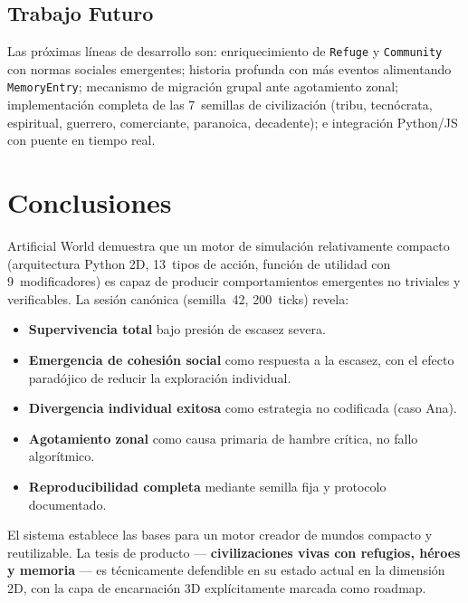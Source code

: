 \documentclass[11pt,a4paper,twocolumn]{article}
\begin{document}
\subsection{Trabajo Futuro}

Las pr\'oximas l\'ineas de desarrollo son: enriquecimiento de
\texttt{Refuge} y \texttt{Community} con normas sociales emergentes;
historia profunda con m\'as eventos alimentando \texttt{MemoryEntry};
mecanismo de migraci\'on grupal ante agotamiento zonal; implementaci\'on
completa de las 7~semillas de civilizaci\'on (tribu, tecn\'ocrata,
espiritual, guerrero, comerciante, paranoica, decadente); e
integraci\'on Python/JS con puente en tiempo real.

\section{Conclusiones}

Artificial World demuestra que un motor de simulaci\'on relativamente
compacto (arquitectura Python 2D, 13~tipos de acci\'on, funci\'on de
utilidad con 9~modificadores) es capaz de producir comportamientos
emergentes no triviales y verificables. La sesi\'on can\'onica
(semilla~42, 200~ticks) revela:

\begin{itemize}[leftmargin=1em, itemsep=2pt, topsep=2pt]
  \item \textbf{Supervivencia total} bajo presi\'on de escasez severa.
  \item \textbf{Emergencia de cohesi\'on social} como respuesta a la
        escasez, con el efecto paradójico de reducir la exploraci\'on
        individual.
  \item \textbf{Divergencia individual exitosa} como estrategia no
        codificada (caso Ana).
  \item \textbf{Agotamiento zonal} como causa primaria de hambre
        cr\'itica, no fallo algorítmico.
  \item \textbf{Reproducibilidad completa} mediante semilla fija y
        protocolo documentado.
\end{itemize}

El sistema establece las bases para un motor creador de mundos compacto
y reutilizable. La tesis de producto ---
\textbf{civilizaciones vivas con refugios, h\'eroes y memoria} ---
es t\'ecnicamente defendible en su estado actual en la dimensi\'on 2D,
con la capa de encarnaci\'on 3D expl\'icitamente marcada como roadmap.
\end{document}
